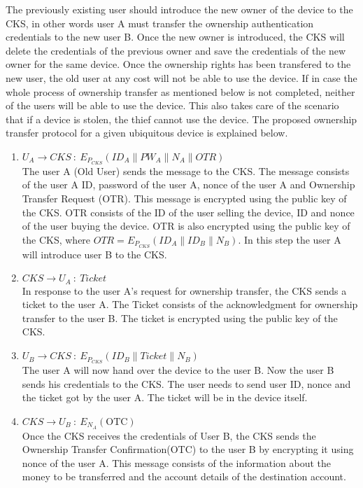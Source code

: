 \documentclass[letterpaper]{article}
\begin{document}
The previously existing user should introduce the new owner of the device to the CKS, in other words user A must transfer the ownership authentication credentials to the new user B. Once the new owner is introduced, the CKS will delete the credentials of the previous owner and save the credentials of the new owner for the same device. Once the ownership rights has been transfered to the new user, the old user at any cost will not be able to use the device. If in case the whole process of ownership transfer as mentioned below is not completed, neither of the users will be able to use the device. This also takes care of the scenario that if a device is stolen, the thief cannot use the device. The proposed ownership transfer protocol for a given ubiquitous device is explained below.
\begin{enumerate}
				\item $ U_A\rightarrow CKS \ :\ E_{P_{CKS}} (ID_{A} \| PW_A \| N_A\| OTR)$ \\ 
				The user A (Old User) sends the message to the CKS. The message consists of the user A ID, password of the user A, nonce of the user A and Ownership Transfer Request (OTR). This message is encrypted using the public key of the CKS. OTR consists of the ID of the user selling the device, ID and nonce of the user buying the device. OTR is also encrypted using the public key of the CKS, where $OTR = E_{P_{CKS}} (ID_A \| ID_B \| N_B)$. In this step the user A will introduce user B to the CKS.  
				\item  $CKS \rightarrow U_A \ :\ Ticket$\\ 
				In response to the user A's request for ownership transfer, the CKS sends a ticket to the user A. The Ticket consists of the acknowledgment for ownership transfer to the user B. The ticket is encrypted using the public key of the CKS.
				\item $U_B \rightarrow CKS \ :\ E_{P_{CKS}}(ID_{B} \| Ticket \| N_B)$\\ 
				The user A will now hand over the device to the user B. Now the user B sends his credentials to the CKS. The user needs to send user ID, nonce and the ticket got by the user A. The ticket will be in the device itself.   
			 \item $CKS \rightarrow U_B \ :\ E_{N_{A}}(\mbox{OTC})$\\ 
					Once the CKS receives the credentials of User B, the CKS sends the Ownership Transfer Confirmation(OTC) to the user B by encrypting it using nonce of the user A. This message consists of the information about the money to be transferred and the account details of the destination account. 

\end{enumerate}
\end{document}
